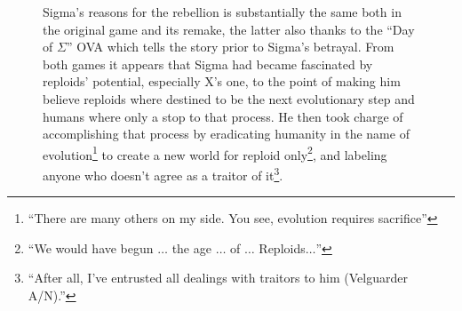 \begin{figure}[htp]
Sigma's reasons for the rebellion is substantially the same both in the original game and its remake, the latter also thanks to the ``Day of $\Sigma$'' OVA which tells the story prior to Sigma's betrayal. From both games it appears that Sigma had became fascinated by reploids' potential, especially X's one, to the point of making him believe reploids where destined to be the next evolutionary step and humans where only a stop to that process\cite{X:Manual}. He then took charge of accomplishing that process by eradicating humanity in the name of evolution\footnote{\enquote{There are many others on my side. You see, evolution requires sacrifice}\cite{wiki:Day_of_Sigma_Script}} to create a new world for reploid  only\footnote{\enquote{We would have begun $\dots$ the age $\dots$ of $\dots$ Reploids$\dots$}\cite{wiki:MMX_script}}, and labeling anyone who doesn't agree as a traitor of it\footnote{\enquote{After all, I’ve entrusted all dealings with traitors to him (Velguarder A/N).}\cite{wordpress:X_japanese_script}}.


\end{figure}
